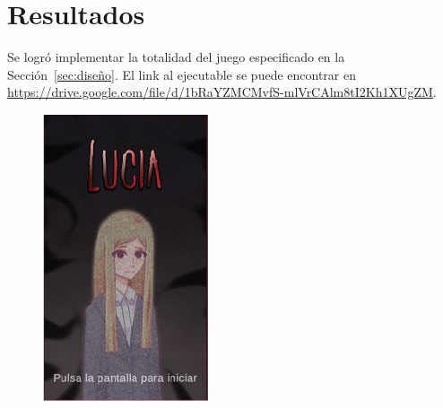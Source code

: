 \section{Resultados}
Se logró implementar la totalidad del juego especificado en la Sección~\ref{sec:diseño}. El link al ejecutable se puede encontrar en \url{https://drive.google.com/file/d/1bRaYZMCMvfS-mlVrCAlm8tI2Kh1XUgZM}.

\begin{figure}[h]
    \centering
    \begin{minipage}{.24\textwidth}
        \includegraphics[width=\textwidth]{imgs/pantalla-inicio.png}

\end{minipage}
\end{figure}
